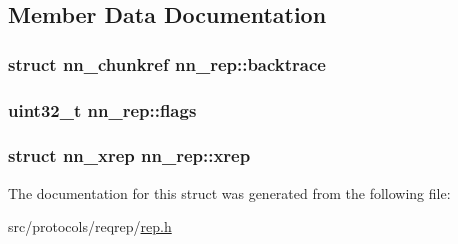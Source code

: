 \subsection{Member Data Documentation}
\subsubsection[{backtrace}]{\setlength{\rightskip}{0pt plus 5cm}struct {\bf nn\+\_\+chunkref} nn\+\_\+rep\+::backtrace}\hypertarget{structnn__rep_a6d121a771946f568bc2c9bcaad475843}{}\label{structnn__rep_a6d121a771946f568bc2c9bcaad475843}
\subsubsection[{flags}]{\setlength{\rightskip}{0pt plus 5cm}uint32\+\_\+t nn\+\_\+rep\+::flags}\hypertarget{structnn__rep_ab14a7c4eee7df0a5fa396ca104d1b542}{}\label{structnn__rep_ab14a7c4eee7df0a5fa396ca104d1b542}
\subsubsection[{xrep}]{\setlength{\rightskip}{0pt plus 5cm}struct {\bf nn\+\_\+xrep} nn\+\_\+rep\+::xrep}\hypertarget{structnn__rep_a3507e3952304e0e106b9ef50b24f163b}{}\label{structnn__rep_a3507e3952304e0e106b9ef50b24f163b}


The documentation for this struct was generated from the following file\+:\begin{DoxyCompactItemize}
\item 
src/protocols/reqrep/\hyperlink{rep_8h}{rep.\+h}\end{DoxyCompactItemize}
